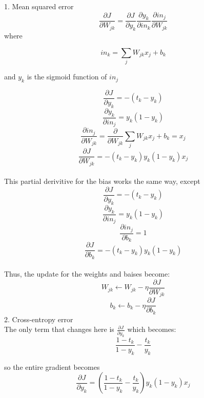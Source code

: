 \documentclass{article}
\begin{document}
1. Mean squared error \\
$$
\frac{\partial J}{\partial W_{jk}} = \frac{\partial J}{\partial y_k}
\frac{\partial y_k}{\partial in_k} \frac{\partial in_j}{\partial W_{jk}}
$$
where

$$
in_k = \sum_j W_{jk} x_j + b_k
$$

and $y_k$ is the sigmoid function of $in_j$

$$
\frac{\partial J}{\partial y_k} = -(t_k - y_k)
$$$$
\frac{\partial y_k}{\partial in_j} = y_k(1 - y_k)
$$$$
\frac{\partial in_j}{\partial W_{jk}} = \frac{\partial}{\partial W_{jk}} \sum_j
W_{jk}x_j + b_k = x_j
$$$$
\frac{\partial J}{\partial W_{jk}} = -(t_k - y_k) y_k(1 - y_k) x_j
$$\\

This partial derivitive for the bias works the same way, except
$$
\frac{\partial J}{\partial y_k} = -(t_k - y_k)
$$$$
\frac{\partial y_k}{\partial in_j} = y_k(1 - y_k)
$$$$
\frac{\partial in_j}{\partial b_k} = 1
$$$$
\frac{\partial J}{\partial b_k} = -(t_k - y_k) y_k(1 - y_k)
$$\\
Thus, the update for the weights and baises become:
$$
W_{jk} \leftarrow W_{jk} - \eta \frac{\partial J}{\partial W_{jk}}
$$
$$
b_{k} \leftarrow b_{k} - \eta \frac{\partial J}{\partial b_{k}}
$$
2. Cross-entropy error \\
The only term that changes here is $\frac{\partial J}{\partial y_k}$ which
becomes:
$$
\frac{1 - t_k}{1 - y_k} - \frac{t_k}{y_k} 
$$

so the entire gradient becomes 
$$
\frac{\partial J}{\partial y_k} = (\frac{1 - t_k}{1 - y_k} - \frac{t_k}{y_k})
y_k(1 - y_k) x_j
$$\\
\end{document}
